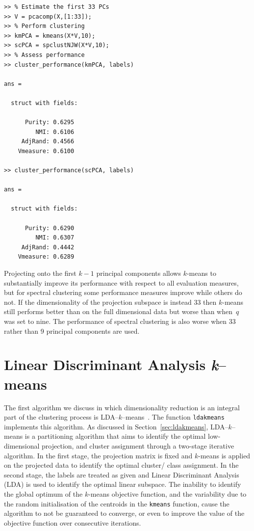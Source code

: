\documentclass{book}
\begin{document}
\begin{lstlisting}
>> % Estimate the first 33 PCs
>> V = pcacomp(X,[1:33]);
>> % Perform clustering
>> kmPCA = kmeans(X*V,10);
>> scPCA = spclustNJW(X*V,10);
>> % Assess performance
>> cluster_performance(kmPCA, labels)

ans = 

  struct with fields:

      Purity: 0.6295
         NMI: 0.6106
     AdjRand: 0.4566
    Vmeasure: 0.6100

>> cluster_performance(scPCA, labels)

ans = 

  struct with fields:

      Purity: 0.6290
         NMI: 0.6307
     AdjRand: 0.4442
    Vmeasure: 0.6289

\end{lstlisting}



\noindent
%
Projecting onto the first $k-1$ principal components allows $k$-means to
substantially improve its performance with respect to all evaluation
measures, but for spectral clustering some performance measures improve
while others do not. If the
dimensionality of the projection subspace is instead 33 then $k$-means
still performs better than on the full dimensional data but worse than
when~$q$ was set to nine. The performance of spectral clustering is also
worse when 33 rather than 9 principal components are used.


\section{Linear Discriminant Analysis {\it k}--means}

The first algorithm we discuss in which dimensionality reduction is an
integral part of the clustering process is LDA--$k$--means~\cite{DingL2007}.
%
The function {\tt ldakmeans} implements this algorithm.
%
As discussed in Section~\ref{sec:ldakmeans}, LDA--$k$--means is a 
partitioning algorithm that aims to identify the optimal low-dimensional
projection, and cluster assignment through a two-stage
iterative algorithm. In the first stage, the projection matrix is fixed and
$k$-means is applied on the projected data to identify the optimal
cluster/ class assignment. In the second stage, the labels are treated as given
and Linear Discriminant Analysis (LDA) is used to identify the optimal linear
subspace.
%
The inability to identify the global optimum of the $k$-means objective
function, and the variability due to the random initialisation of the centroids
in the {\tt kmeans} function, cause
the algorithm to not be guaranteed to converge, or even to improve the value of the
objective function over consecutive iterations. 
\end{document}

